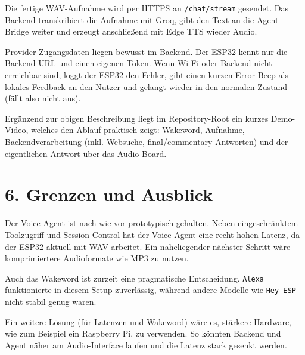 \documentclass[11pt,a4paper]{article}
\begin{document}
Die fertige WAV-Aufnahme wird per HTTPS an \texttt{/chat/stream} gesendet. Das Backend transkribiert die Aufnahme mit Groq, gibt den Text an die Agent Bridge weiter und erzeugt anschließend mit Edge TTS wieder Audio.

Provider-Zugangsdaten liegen bewusst im Backend. Der ESP32 kennt nur die Backend-URL und einen eigenen Token. Wenn Wi-Fi oder Backend nicht erreichbar sind, loggt der ESP32 den Fehler, gibt einen kurzen Error Beep als lokales Feedback an den Nutzer und gelangt wieder in den normalen Zustand (fällt also nicht aus).

Ergänzend zur obigen Beschreibung liegt im Repository-Root ein kurzes Demo-Video, welches den Ablauf praktisch zeigt: Wakeword, Aufnahme, Backendverarbeitung (inkl. Websuche, final/commentary-Antworten) und der eigentlichen Antwort über das Audio-Board.

\section*{6. Grenzen und Ausblick}

Der Voice-Agent ist nach wie vor prototypisch gehalten. Neben eingeschränktem Toolzugriff und Session-Control hat der Voice Agent eine recht hohen Latenz, da der ESP32 aktuell mit WAV arbeitet. Ein naheliegender nächster Schritt wäre komprimiertere Audioformate wie MP3 zu nutzen.

Auch das Wakeword ist zurzeit eine pragmatische Entscheidung. \texttt{Alexa} funktionierte in diesem Setup zuverlässig, während andere Modelle wie \texttt{Hey ESP} nicht stabil genug waren.

Ein weitere Lösung (für Latenzen und Wakeword) wäre es, stärkere Hardware, wie zum Beispiel ein Raspberry Pi, zu verwenden. So könnten Backend und Agent näher am Audio-Interface laufen und die Latenz stark gesenkt werden.
\end{document}
